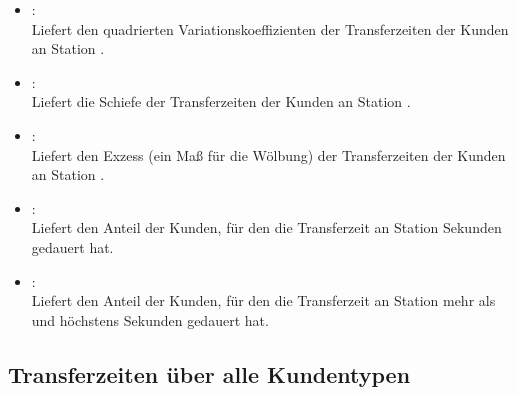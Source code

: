 \begin{itemize}
\item
{}:\\
Liefert den quadrierten Variationskoeffizienten der Transferzeiten der Kunden an Station .

\item
{}:\\
Liefert die Schiefe der Transferzeiten der Kunden an Station .

\item
{}:\\
Liefert den Exzess (ein Maß für die Wölbung) der Transferzeiten der Kunden an Station .

\item
{}:\\
Liefert den Anteil der Kunden, für den die Transferzeit an Station   Sekunden gedauert hat.

\item
{}:\\
Liefert den Anteil der Kunden, für den die Transferzeit an Station  mehr als  und höchstens  Sekunden gedauert hat.

\end{itemize}  



\subsection{Transferzeiten über alle Kundentypen}


